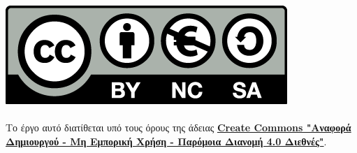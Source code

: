 \vspace*{\fill}

\begin{center}
    \href{https://creativecommons.org/licenses/by-nc-sa/4.0/deed.el}{\includegraphics[scale=0.2]{images/cc.png}} \\
    \Rule \\[0.4cm]
    Το έργο αυτό διατίθεται υπό τους όρους της άδειας \textbf{\href{https://creativecommons.org/licenses/by-nc-sa/4.0/deed.el}{Create Commons "Αναφορά Δημιουργού - Μη Εμπορική Χρήση - Παρόμοια Διανομή 4.0 Διεθνές"}}. \\ 
\end{center}

